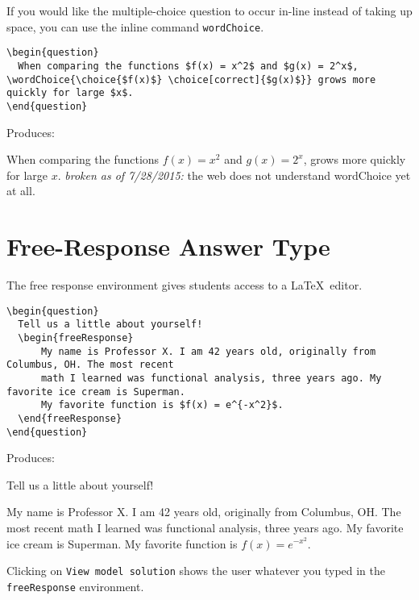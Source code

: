 \documentclass{ximera}
\begin{document}
\begin{example}
If you would like the multiple-choice question to occur in-line instead of taking up space, you can use the inline command \verb!wordChoice!.
 
\begin{verbatim}
\begin{question}
  When comparing the functions $f(x) = x^2$ and $g(x) = 2^x$, \wordChoice{\choice{$f(x)$} \choice[correct]{$g(x)$}} grows more quickly for large $x$.
\end{question}
\end{verbatim}

Produces:

\begin{question}
  When comparing the functions $f(x) = x^2$ and $g(x) = 2^x$,  grows more quickly for large $x$.
  \emph{broken as of 7/28/2015:} the web does not understand wordChoice yet at all.
\end{question}
\end{example}

\section{Free-Response Answer Type} \label{FRAnswerType}

\begin{example}The free response environment gives students access to a \LaTeX\ editor. 

\begin{verbatim}
\begin{question}
  Tell us a little about yourself!
  \begin{freeResponse}
      My name is Professor X. I am 42 years old, originally from Columbus, OH. The most recent 
      math I learned was functional analysis, three years ago. My favorite ice cream is Superman. 
      My favorite function is $f(x) = e^{-x^2}$.
  \end{freeResponse}
\end{question}
\end{verbatim}

Produces:

\begin{question}
  Tell us a little about yourself!
  \begin{freeResponse}
      My name is Professor X. I am 42 years old, originally from Columbus, OH. The most recent 
      math I learned was functional analysis, three years ago. My favorite ice cream is Superman. 
      My favorite function is $f(x) = e^{-x^2}.$
  \end{freeResponse}
\end{question}

\begin{remark}
Clicking on \verb!View model solution! shows the user
whatever you typed in the  \verb!freeResponse! environment.
\end{remark}
\end{example}
\end{document}
